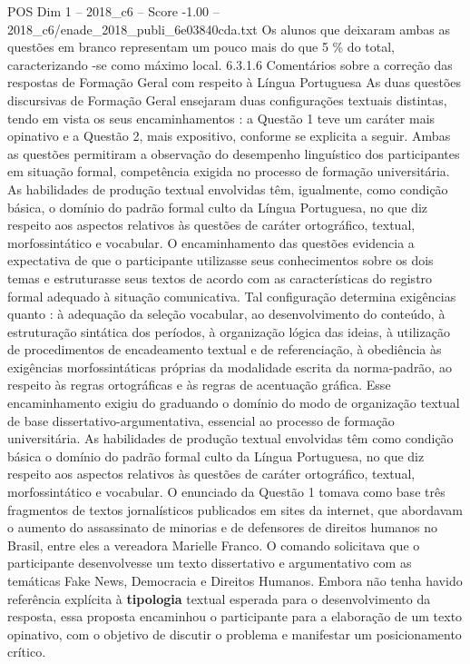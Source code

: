 \begin{textsample}{POS Dim 1 – 2018\_c6 – Score -1.00 – 2018\_c6/enade\_2018\_publi\_6e03840cda.txt}
Os alunos que deixaram ambas as questões em branco representam um pouco mais do que 5 \% do total, caracterizando -se como máximo local. 6.3.1.6 Comentários sobre a correção das respostas de Formação Geral com respeito à Língua Portuguesa As duas questões discursivas de Formação Geral ensejaram duas configurações textuais distintas, tendo em vista os seus encaminhamentos : a Questão 1 teve um caráter mais opinativo e a Questão 2, mais expositivo, conforme se explicita a seguir.
Ambas as questões permitiram a observação do desempenho linguístico dos participantes em situação formal, competência exigida no processo de formação universitária.
As habilidades de produção textual envolvidas têm, igualmente, como condição básica, o domínio do padrão formal culto da Língua Portuguesa, no que diz respeito aos aspectos relativos às questões de caráter ortográfico, textual, morfossintático e vocabular.
O encaminhamento das questões evidencia a expectativa de que o participante utilizasse seus conhecimentos sobre os dois temas e estruturasse seus textos de acordo com as características do registro formal adequado à situação comunicativa.
Tal configuração determina exigências quanto : à adequação da seleção vocabular, ao desenvolvimento do conteúdo, à estruturação sintática dos períodos, à organização lógica das ideias, à utilização de procedimentos de encadeamento textual e de referenciação, à obediência às exigências morfossintáticas próprias da modalidade escrita da norma-padrão, ao respeito às regras ortográficas e às regras de acentuação gráfica.
Esse encaminhamento exigiu do graduando o domínio do modo de organização textual de base dissertativo-argumentativa, essencial ao processo de formação universitária.
As habilidades de produção textual envolvidas têm como condição básica o domínio do padrão formal culto da Língua Portuguesa, no que diz respeito aos aspectos relativos às questões de caráter ortográfico, textual, morfossintático e vocabular.
O enunciado da Questão 1 tomava como base três fragmentos de textos jornalísticos publicados em sites da internet, que abordavam o aumento do assassinato de minorias e de defensores de direitos humanos no Brasil, entre eles a vereadora Marielle Franco.
O comando solicitava que o participante desenvolvesse um texto dissertativo e argumentativo com as temáticas Fake News, Democracia e Direitos Humanos.
Embora não tenha havido referência explícita à \textbf{tipologia} textual esperada para o desenvolvimento da resposta, essa proposta encaminhou o participante para a elaboração de um texto opinativo, com o objetivo de discutir o problema e manifestar um posicionamento crítico.

\end{textsample}

